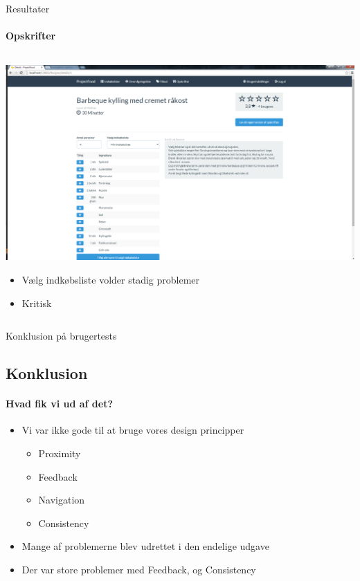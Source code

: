 \begin{frame}{Resultater}
\framesubtitle{Opskrifter}

	
	\begin{minipage}[0.3\textheight]{\textwidth}
	\begin{columns}[T]
	\begin{column}{1\textwidth}
	 \includegraphics[width=1\textwidth,height=1\textheight,keepaspectratio, trim={1cm 0 0 16mm}, clip]{images/Screenshots/PickedRecipe.png}
	 
	 	\begin{itemize}
	 		\item Vælg indkøbsliste volder stadig problemer
	 		\item Kritisk
	 	\end{itemize}
	
	\end{column}

	\end{columns}

  \end{minipage}
	
\end{frame}

\begin{frame}{Konklusion på brugertests}
\subsection{Konklusion}
\framesubtitle{Hvad fik vi ud af det?}

	
\begin{itemize}
	\item Vi var ikke gode til at bruge vores design principper
		\begin{itemize}
			\item Proximity
			\item Feedback
			\item Navigation
			\item Consistency
		\end{itemize}
	\item Mange af problemerne blev udrettet i den endelige udgave
	\item Der var store problemer med Feedback, og Consistency
\end{itemize}
  
\end{frame}


